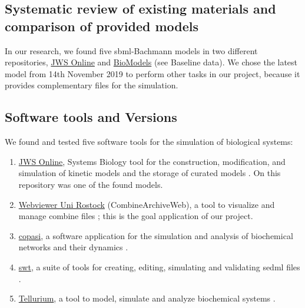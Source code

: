 \subsection*{Systematic review of existing materials and comparison of provided models}
In our research, we found five \ac{sbml}-Bachmann models in two different repositories, \hyperlink{https://www.systemsmedicine.net/posts/jws-online-biological-systems-modelling}{JWS Online} and \hyperlink{https://www.ebi.ac.uk/biomodels/}{BioModels} (see Baseline data). We chose the latest model from 14th November 2019 to perform other tasks in our project, because it provides complementary files for the simulation.

\subsection*{Software tools and Versions}
We found and tested five software tools for the simulation of biological systems:
\begin{enumerate} 
    \item \hyperlink{https://www.systemsmedicine.net/posts/jws-online-biological-systems-modelling}{JWS Online}, Systems Biology tool for the construction, modification, and simulation of kinetic models and the storage of curated models \cite{jwsonline}. On this repository was one of the found models.
    \item \hyperlink{https://cat.bio.informatik.uni-rostock.de/}{Webviewer Uni Rostock} (CombineArchiveWeb), a tool to visualize and manage \ac{combine} files \cite{combine}; this is the goal application of our project. 
    \item \hyperlink{http://copasi.org/}{\ac{copasi}}, a software application for the simulation and analysis of biochemical networks and their dynamics \cite{copasi}.
    \item \hyperlink{https://sed-ml.org/}{\ac{swt}}, a suite of tools for creating, editing, simulating and validating \ac{sedml} files \cite{sedml}. 
    \item \hyperlink{https://tellurium.readthedocs.io/en/latest/}{Tellurium},  a tool to model, simulate and analyze biochemical systems \cite{tellurium}.
\end{enumerate}

